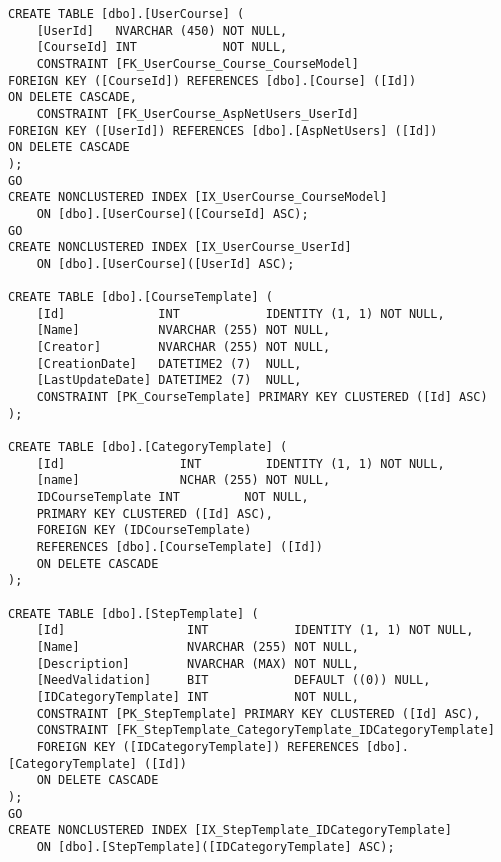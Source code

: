 \begin{lstlisting}[style=sql_style, caption=esempio sezione codice Javascript per la creazione di un grafico a barre per la rappresentazione dei dati]
CREATE TABLE [dbo].[UserCourse] ( 
    [UserId]   NVARCHAR (450) NOT NULL, 
    [CourseId] INT            NOT NULL, 
    CONSTRAINT [FK_UserCourse_Course_CourseModel]  
FOREIGN KEY ([CourseId]) REFERENCES [dbo].[Course] ([Id]) 
ON DELETE CASCADE, 
    CONSTRAINT [FK_UserCourse_AspNetUsers_UserId]  
FOREIGN KEY ([UserId]) REFERENCES [dbo].[AspNetUsers] ([Id]) 
ON DELETE CASCADE 
); 
GO 
CREATE NONCLUSTERED INDEX [IX_UserCourse_CourseModel] 
    ON [dbo].[UserCourse]([CourseId] ASC); 
GO 
CREATE NONCLUSTERED INDEX [IX_UserCourse_UserId] 
    ON [dbo].[UserCourse]([UserId] ASC); 
    
CREATE TABLE [dbo].[CourseTemplate] ( 
    [Id]             INT            IDENTITY (1, 1) NOT NULL, 
    [Name]           NVARCHAR (255) NOT NULL, 
    [Creator]        NVARCHAR (255) NOT NULL, 
    [CreationDate]   DATETIME2 (7)  NULL, 
    [LastUpdateDate] DATETIME2 (7)  NULL, 
    CONSTRAINT [PK_CourseTemplate] PRIMARY KEY CLUSTERED ([Id] ASC) 
); 
    
CREATE TABLE [dbo].[CategoryTemplate] ( 
    [Id]                INT         IDENTITY (1, 1) NOT NULL, 
    [name]              NCHAR (255) NOT NULL, 
    IDCourseTemplate INT         NOT NULL, 
    PRIMARY KEY CLUSTERED ([Id] ASC), 
    FOREIGN KEY (IDCourseTemplate)  
    REFERENCES [dbo].[CourseTemplate] ([Id]) 
    ON DELETE CASCADE 
); 
    
CREATE TABLE [dbo].[StepTemplate] ( 
    [Id]                 INT            IDENTITY (1, 1) NOT NULL, 
    [Name]               NVARCHAR (255) NOT NULL, 
    [Description]        NVARCHAR (MAX) NOT NULL, 
    [NeedValidation]     BIT            DEFAULT ((0)) NULL, 
    [IDCategoryTemplate] INT            NOT NULL, 
    CONSTRAINT [PK_StepTemplate] PRIMARY KEY CLUSTERED ([Id] ASC), 
    CONSTRAINT [FK_StepTemplate_CategoryTemplate_IDCategoryTemplate]  
    FOREIGN KEY ([IDCategoryTemplate]) REFERENCES [dbo].[CategoryTemplate] ([Id]) 
    ON DELETE CASCADE 
); 
GO 
CREATE NONCLUSTERED INDEX [IX_StepTemplate_IDCategoryTemplate] 
    ON [dbo].[StepTemplate]([IDCategoryTemplate] ASC);
\end{lstlisting}
